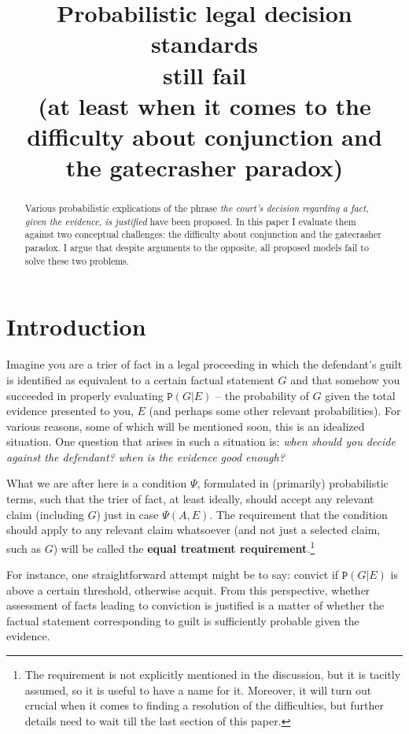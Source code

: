 \documentclass{ifcolog}
\title{Probabilistic legal decision standards \\  still fail   
\\[2mm] \normalsize (at least when it comes to the difficulty about conjunction and  \\[-2mm]  the gatecrasher paradox)}
\newcommand{\pr}[1]{\mbox{$\mathtt{P}(#1)$}}
\begin{document}
\maketitle

\begin{abstract}
  Various  probabilistic explications of  the phrase \emph{the court's decision regarding a fact, given the evidence, is justified} have been proposed. In this paper I evaluate them against two conceptual challenges: the difficulty about conjunction and the gatecrasher paradox. I argue that despite arguments to the opposite, all proposed models fail to solve these two problems.
\end{abstract}





\section{Introduction}\label{sec:introduction}

Imagine you are a trier of fact in a legal proceeding in which the defendant's guilt is identified as equivalent to a certain factual statement $G$ and that somehow you succeeded in properly evaluating $\pr{G\vert E}$ -- the probability of $G$ given the total evidence presented to you, $E$ (and perhaps some other relevant probabilities). For various reasons, some of which  will be mentioned soon, this is an idealized situation. One question that arises in such a situation is: \emph{when should you decide against the defendant? when is the evidence good enough?} 

What we are after here is a condition $\Psi$, formulated in (primarily) probabilistic terms, such that the trier of fact, at least ideally, should accept any relevant claim (including $G$) just in case $\Psi(A,E)$. The requirement that the condition should apply to any relevant claim whatsoever (and not just a selected claim, such as $G$) will be called the \textbf{equal treatment requirement}.\footnote{The requirement is not explicitly mentioned in the discussion, but it is tacitly assumed, so it is useful to have a name for it. Moreover, it will turn out crucial when it comes to finding a resolution of the difficulties, but further details need to wait till the last section of this paper.}

For instance, one straightforward attempt might be to say: convict if $\pr{G\vert E}$ is above a certain threshold, otherwise acquit. From this perspective, whether assessment of facts leading to conviction is justified is a matter of whether the factual statement corresponding to guilt is sufficiently probable given the evidence. 
\end{document}
